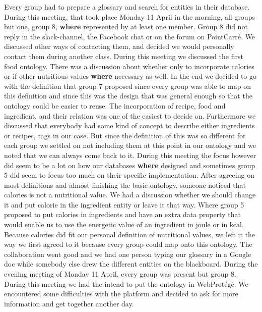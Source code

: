 Every group had to prepare a glossary and search for entities in their database. During this meeting, that took place Monday 11 April in the morning, all groups but one, group 8, \textbf{where} represented by at least one member. Group 8 did not reply in the slack-channel, the Facebook chat or on the forum on PointCarr\'e. We discussed other ways of contacting them, and decided we would personally contact them during another class. During this meeting we discussed the first food ontology. There was a discussion about whether only to incorporate calories or if other nutritious values \textbf{where} necessary as well. In the end we decided to go with the definition that group 7 proposed since every group was able to map on this definition and since this was the design that was general enough so that the ontology could be easier to reuse. The incorporation of recipe, food and ingredient, and their relation was one of the easiest to decide on. Furthermore we discussed that everybody had some kind of concept to describe either ingredients or recipes, tags in our case. But since the definition of this was so different for each group we settled on not including them at this point in our ontology and we noted that we can always come back to it. During this meeting the focus however did seem to be a lot on how our databases \textbf{where} designed and sometimes group 5 did seem to focus too much on their specific implementation. After agreeing on most definitions and almost finishing the basic ontology, someone noticed that calories is not a nutritional value. We had a discussion whether we should change it and put calorie in the ingredient entity or leave it that way. Where group 5 proposed to put calories in ingredients and have an extra data property that would enable us to use the energetic value of an ingredient in joule or in kcal. Because calories did fit our personal definition of nutritional values, we left it the way we first agreed to it because every group could map onto this ontology. The collaboration went good and we had one person typing our glossary in a Google doc while somebody else drew the different entities on the blackboard. 
\newline
\newline
\noindent
During the evening meeting of Monday 11 April, every group was present but group 8. During this meeting we had the intend to put the ontology in  WebProtégé. We encountered some difficulties with the platform and decided to ask for more information and get together another day. 
\newline
